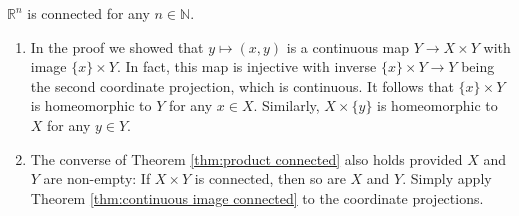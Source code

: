 \documentclass[a4paper]{article}
\begin{document}
\begin{example}
    $\mathbb{R}^{n}$ is connected for any $n \in \mathbb{N}$.
\end{example}

\begin{remark}
    \begin{enumerate}
        \item In the proof we showed that $y \mapsto(x, y)$ is a continuous map $Y \rightarrow X \times Y$ with image $\{x\} \times Y$. In fact, this map is injective with inverse $\{x\} \times Y \rightarrow Y$ being the second coordinate projection, which is continuous. It follows that $\{x\} \times Y$ is homeomorphic to $Y$ for any $x \in X$. Similarly, $X \times\{y\}$ is homeomorphic to $X$ for any $y \in Y$.
      
        \item The converse of Theorem \ref{thm:product connected} also holds provided $X$ and $Y$ are non-empty: If $X \times Y$ is connected, then so are $X$ and $Y$. Simply apply Theorem \ref{thm:continuous image connected} to the coordinate projections.
      \end{enumerate}
\end{remark}
\end{document}
